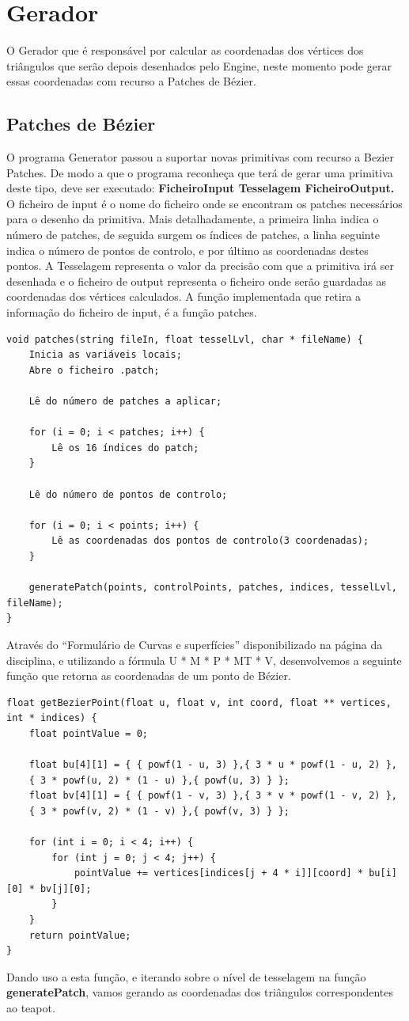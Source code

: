 \documentclass[12pt]{article}
\begin{document}
\section{Gerador}
O Gerador que é responsável por calcular as coordenadas dos vértices dos triângulos que serão depois desenhados pelo Engine, neste
momento pode gerar essas coordenadas com recurso a Patches de Bézier.
\subsection{Patches de Bézier}
O programa Generator passou a suportar novas primitivas com recurso
a Bezier Patches. De modo a que o programa reconheça que terá de gerar uma
primitiva deste tipo, deve ser executado: \textbf{FicheiroInput Tesselagem FicheiroOutput.} \\
O ficheiro de input é o nome
do ficheiro onde se encontram os patches necessários para o desenho da primitiva. Mais detalhadamente, 
a primeira linha indica o número de patches, de seguida surgem os índices de patches, a linha seguinte
indica o número de pontos de controlo, e por último as coordenadas destes pontos.
A Tesselagem representa o valor da precisão com que a primitiva irá
ser desenhada e o ficheiro de output representa o ficheiro onde serão guardadas
as coordenadas dos vértices calculados.
A função implementada que retira a informação do ficheiro de input, é a função patches.
\begin{verbatim}
void patches(string fileIn, float tesselLvl, char * fileName) {
    Inicia as variáveis locais;
    Abre o ficheiro .patch;
    
    Lê do número de patches a aplicar;
    
    for (i = 0; i < patches; i++) {
        Lê os 16 índices do patch;	
    }
        
    Lê do número de pontos de controlo;

    for (i = 0; i < points; i++) {
        Lê as coordenadas dos pontos de controlo(3 coordenadas);
    }
    
    generatePatch(points, controlPoints, patches, indices, tesselLvl, fileName);    
}
\end{verbatim}
Através do “Formulário de Curvas e superfícies” disponibilizado na página da disciplina, e utilizando a fórmula U * M * P * MT
* V, desenvolvemos a seguinte função que retorna as coordenadas de um ponto de Bézier.
\begin{verbatim}
float getBezierPoint(float u, float v, int coord, float ** vertices, int * indices) {
    float pointValue = 0;
    
    float bu[4][1] = { { powf(1 - u, 3) },{ 3 * u * powf(1 - u, 2) },
    { 3 * powf(u, 2) * (1 - u) },{ powf(u, 3) } };
    float bv[4][1] = { { powf(1 - v, 3) },{ 3 * v * powf(1 - v, 2) },
    { 3 * powf(v, 2) * (1 - v) },{ powf(v, 3) } };
    
    for (int i = 0; i < 4; i++) {
        for (int j = 0; j < 4; j++) {
            pointValue += vertices[indices[j + 4 * i]][coord] * bu[i][0] * bv[j][0];
        }
    }
    return pointValue;
}
\end{verbatim} 
Dando uso a esta função, e iterando sobre o nível de tesselagem na função \textbf{generatePatch}, vamos gerando as coordenadas dos triângulos correspondentes ao teapot.
\newpage
\end{document}
